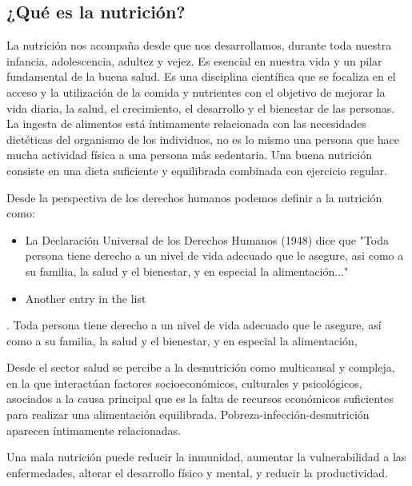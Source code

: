 \subsection{¿Qué es la nutrición?}
\label{nutrición}


La nutrición nos acompaña desde que nos desarrollamos, durante toda nuestra infancia, adolescencia, adultez y vejez. Es esencial en nuestra vida y un pilar fundamental de la buena salud. Es una disciplina científica que se focaliza en el acceso y la utilización de la comida y nutrientes con el objetivo de mejorar la vida diaria, la salud, el crecimiento, el desarrollo y el bienestar de las personas\cite{nutritionForHealthAndDevelopment}. La ingesta de alimentos está íntimamente relacionada con las necesidades dietéticas del organismo de los individuos, no es lo mismo una persona que hace mucha actividad física a una persona más sedentaria. Una buena nutrición consiste en una dieta suficiente y equilibrada combinada con ejercicio regular.

Desde la perspectiva de los derechos humanos podemos definir a la nutrición como:

\begin{itemize}
  \item La Declaración Universal de los Derechos Humanos (1948) dice que "Toda persona tiene derecho a un nivel de vida adecuado que le asegure, asi como a su familia, la salud y el bienestar, y en especial la alimentación..." \cite{declaracionUniversalDDHH}
  \item Another entry in the list
\end{itemize}


. Toda persona tiene derecho a un nivel de vida adecuado que le asegure, así como a su familia, la salud y el bienestar, y en especial la alimentación,














Desde el sector salud se percibe a la desnutrición como multicausal y compleja, en la que interactúan factores socioeconómicos, culturales y psicológicos, asociados a la causa principal que es la falta de recursos económicos suficientes para realizar una alimentación equilibrada. Pobreza-infección-desnutrición aparecen íntimamente relacionadas.

Una mala nutrición puede reducir la inmunidad, aumentar la vulnerabilidad a las enfermedades, alterar el desarrollo físico y mental, y reducir la productividad.
